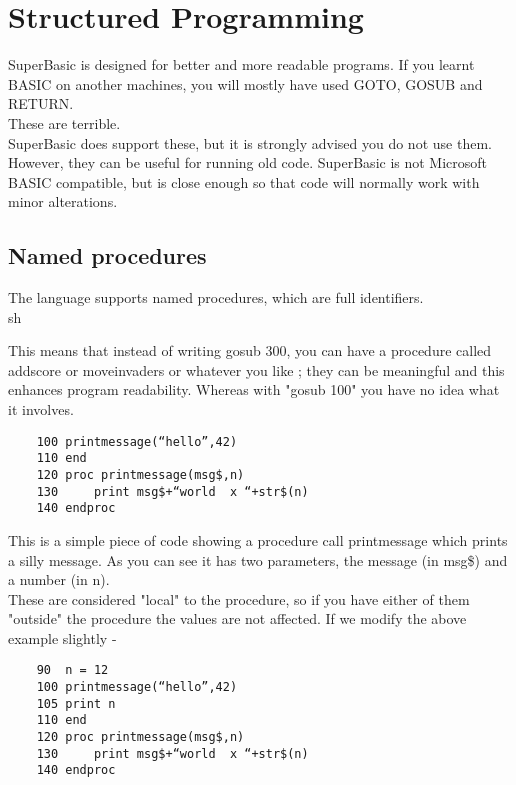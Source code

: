 \chapter{Structured Programming}

SuperBasic is designed for better and more readable programs. If you learnt BASIC on another machines, you will mostly have used GOTO, GOSUB and RETURN.\\

These are terrible.\\

SuperBasic does support these, but it is strongly advised you do not use them. However, they can be useful for running old code. SuperBasic is not Microsoft BASIC compatible, but is close enough so that code will normally work with minor alterations.

\section{Named procedures}

The language supports named procedures, which are full identifiers.\\sh 

This means that instead of writing gosub 300, you can have a procedure called addscore or moveinvaders or whatever you like ; they can be meaningful and this enhances program readability. Whereas with "gosub 100" you have no idea what it involves.\\

\begin{verbatim}
	100 printmessage(“hello”,42)
	110 end
	120 proc printmessage(msg$,n)
	130 	print msg$+“world  x “+str$(n)
	140 endproc
\end{verbatim}

This is a simple piece of code showing a procedure call printmessage which prints a silly message. As you can see it has two parameters, the message (in msg\$) and a number (in n). \\

These are considered "local" to the procedure, so if you have either of them "outside" the procedure the values are not affected. If we modify the above example slightly -

\begin{verbatim}
	90  n = 12
	100 printmessage(“hello”,42)
	105 print n
	110 end
	120 proc printmessage(msg$,n)
	130 	print msg$+“world  x “+str$(n)
	140 endproc
\end{verbatim}

